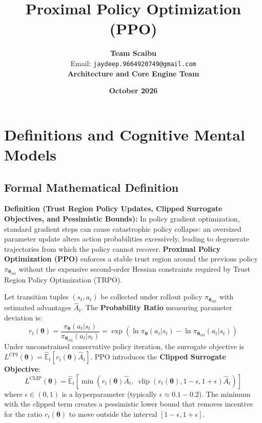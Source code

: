 \documentclass[11pt,a4paper]{article}
\title{\textbf{Proximal Policy Optimization (PPO)}}
\author{\textbf{Team Scaibu} \\ \small Email: \texttt{jaydeep.9664920749@gmail.com} \\ \small \textbf{Architecture and Core Engine Team}}
\date{\textbf{October 2026}}
\theoremstyle{definition}
\begin{document}
\maketitle

\section{Definitions and Cognitive Mental Models}

\subsection{Formal Mathematical Definition}
\textbf{Definition (Trust Region Policy Updates, Clipped Surrogate Objectives, and Pessimistic Bounds):}
In policy gradient optimization, standard gradient steps can cause catastrophic policy collapse: an oversized parameter update alters action probabilities excessively, leading to degenerate trajectories from which the policy cannot recover. \textbf{Proximal Policy Optimization (PPO)} enforces a stable trust region around the previous policy $\pi_{\boldsymbol{\theta}_{\text{old}}}$ without the expensive second-order Hessian constraints required by Trust Region Policy Optimization (TRPO).

Let transition tuples $(s_t, a_t)$ be collected under rollout policy $\pi_{\boldsymbol{\theta}_{\text{old}}}$ with estimated advantages $\widehat{A}_t$. The \textbf{Probability Ratio} measuring parameter deviation is:
{\boldmath
\begin{equation}
r_t(\boldsymbol{\theta}) = \frac{\pi_{\boldsymbol{\theta}}(a_t | s_t)}{\pi_{\boldsymbol{\theta}_{\text{old}}}(a_t | s_t)} = \exp\left( \ln \pi_{\boldsymbol{\theta}}(a_t | s_t) - \ln \pi_{\boldsymbol{\theta}_{\text{old}}}(a_t | s_t) \right)
\end{equation}
}
Under unconstrained conservative policy iteration, the surrogate objective is $L^{\text{CPI}}(\boldsymbol{\theta}) = \widehat{\mathbb{E}}_t \left[ r_t(\boldsymbol{\theta}) \widehat{A}_t \right]$. PPO introduces the \textbf{Clipped Surrogate Objective}:
{\boldmath
\begin{equation}
L^{\text{CLIP}}(\boldsymbol{\theta}) = \widehat{\mathbb{E}}_t \left[ \min\left( r_t(\boldsymbol{\theta}) \widehat{A}_t, \; \operatorname{clip}(r_t(\boldsymbol{\theta}), 1 - \epsilon, 1 + \epsilon) \widehat{A}_t \right) \right]
\end{equation}
}
where $\epsilon \in (0, 1)$ is a hyperparameter (typically $\epsilon \approx 0.1 - 0.2$). The minimum with the clipped term creates a pessimistic lower bound that removes incentive for the ratio $r_t(\boldsymbol{\theta})$ to move outside the interval $[1 - \epsilon, 1 + \epsilon]$.
\end{document}
